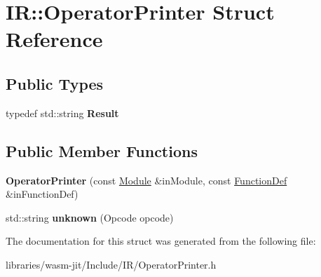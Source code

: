 \hypertarget{struct_i_r_1_1_operator_printer}{}\section{IR\+:\+:Operator\+Printer Struct Reference}
\label{struct_i_r_1_1_operator_printer}
\subsection*{Public Types}
\begin{DoxyCompactItemize}
\item 
\mbox{\label{struct_i_r_1_1_operator_printer_acbfbd3da353beba4042dfa333402725d}} 
typedef std\+::string {\bfseries Result}
\end{DoxyCompactItemize}
\subsection*{Public Member Functions}
\begin{DoxyCompactItemize}
\item 
\mbox{\label{struct_i_r_1_1_operator_printer_a070f8560b53be013d9c1d0c942063ffb}} 
{\bfseries Operator\+Printer} (const \mbox{\hyperlink{struct_i_r_1_1_module}{Module}} \&in\+Module, const \mbox{\hyperlink{struct_i_r_1_1_function_def}{Function\+Def}} \&in\+Function\+Def)
\item 
\mbox{\label{struct_i_r_1_1_operator_printer_a4cb3aa62f40cb458a67127836911298f}} 
std\+::string {\bfseries unknown} (Opcode opcode)
\end{DoxyCompactItemize}


The documentation for this struct was generated from the following file\+:\begin{DoxyCompactItemize}
\item 
libraries/wasm-\/jit/\+Include/\+I\+R/Operator\+Printer.\+h\end{DoxyCompactItemize}
